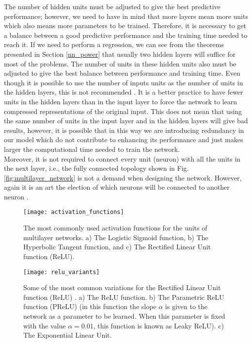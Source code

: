The number of hidden units must be adjusted to give the best predictive performance; however, we need to have in mind that more layers mean more units which also means more parameters to be trained. Therefore, it is necessary to get a balance between a good predictive performance and the training time needed to reach it. If we need to perform a regression, we can see from the theorems presented in Section \ref{nn_power} that usually two hidden layers will suffice for most of the problems. The number of units in these hidden units also must be adjusted to give the best balance between performance and training time. Even though it is possible to use the number of inputs units as the number of units in the hidden layers, this is not recommended \cite{fudamentals_deep_learning}. It is a better practice to have fewer units in the hidden layers than in the input layer to force the network to learn compressed representations of the original input. This does not mean that using the same number of units in the input layer and in the hidden layers will give bad results, however, it is possible that in this way we are introducing redundancy in our model which do not contribute to enhancing its performance and just makes larger the computational time needed to train the network.\\

Moreover, it is not required to connect every unit (neuron) with all the units in the next layer, i.e., the fully connected topology shown in Fig. \ref{fig:multilayer_network} is not a demand when designing the network. However, again it is an art the election of which neurons will be connected to another neuron \cite{fudamentals_deep_learning}.\\

\begin{figure}
\centering
\texttt{[image: activation\_functions]}
\caption[The most commonly used activation functions for the units of multilayer networks.]{The most commonly used activation functions for the units of multilayer networks. a) The Logistic Sigmoid function, b) The Hyperbolic Tangent function, and c) The Rectified Linear Unit function (ReLU).}
\label{fig:activation_functions}
\end{figure}

\begin{figure}
\centering
\texttt{[image: relu\_variants]}
\caption[Some of the most common variations for the Rectified Linear Unit function (ReLU).]{Some of the most common variations for the Rectified Linear Unit function (ReLU) \cite{relu_online} \cite{act_fun_online}. a) The ReLU function. b) The Parametric ReLU function (PReLU) (in this function the slope $\alpha$ is given to the network as a parameter to be learned. When this parameter is fixed with the value $\alpha=0.01$, this function is known as Leaky ReLU). c) The Exponential Linear Unit.}
\label{fig:relu_variants}
\end{figure}


